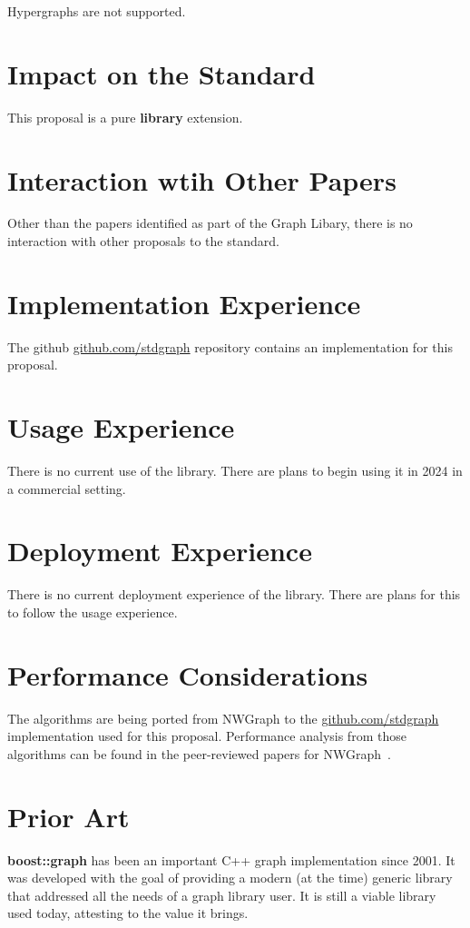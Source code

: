 Hypergraphs are not supported.

\section{Impact on the Standard}
This proposal is a pure \textbf{library} extension.

\section{Interaction wtih Other Papers}
Other than the papers identified as part of the Graph Libary, there is no interaction with other proposals to the standard.

\section{Implementation Experience}
The github \href{https://github.com/stdgraph}{github.com/stdgraph} repository contains an implementation for this proposal.

\section{Usage Experience}
There is no current use of the library. There are plans to begin using it in 2024 in a commercial setting.

\section{Deployment Experience}
There is no current deployment experience of the library. There are plans for this to follow the usage experience.

\section{Performance Considerations}
The algorithms are being ported from NWGraph to the \href{https://github.com/stdgraph}{github.com/stdgraph} implementation used for this proposal. 
Performance analysis from those algorithms can be found in the peer-reviewed papers for NWGraph~\cite{REF_nwgraph_paper,gapbs_2023}.

\section{Prior Art}
\textbf{boost::graph} has been an important C++ graph implementation since 2001. It was developed with the goal of providing
a modern (at the time) generic library that addressed all the needs of a graph library user. It is still a viable library used today, attesting to the value it brings.

